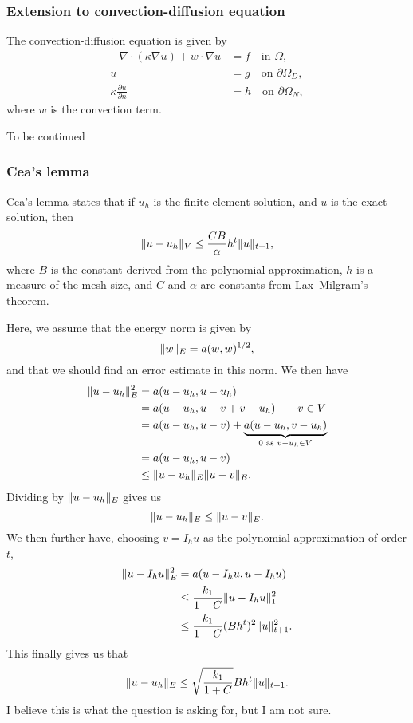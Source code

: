 \subsubsection{Extension to convection-diffusion equation}
The convection-diffusion equation is given by
\begin{equation}
    \begin{split}
        -\nabla \cdot (\kappa \nabla u) + w \cdot \nabla u &= f \quad \text{in } \Omega, \\
        u &= g \quad \text{on } \partial\Omega_D, \\
        \kappa \frac{\partial u}{\partial n} &= h \quad \text{on } \partial\Omega_N,
    \end{split}
\end{equation}
where $w$ is the convection term.

{\Large To be continued}

\subsubsection{Cea's lemma}
Cea's lemma states that if $u_h$ is the finite element solution, and $u$ is the exact solution, then
\begin{equation}
    \lVert u - u_h\rVert_V \leq \frac{C B}{\alpha} h^t \lVert u\rVert_{t + 1},
\end{equation}
where $B$ is the constant derived from the polynomial approximation, $h$ is a measure of the mesh size, and $C$ and $\alpha$ are constants from Lax--Milgram's theorem. %

Here, we assume that the energy norm is given by
\begin{equation}
    \lVert w\rVert_E = a(w, w)^{1/2},
\end{equation}
and that we should find an error estimate in this norm.
We then have
\begin{align*}
    \lVert u - u_h\rVert_E^2 &= a(u - u_h, u - u_h) \\
    &= a(u - u_h, u - v + v - u_h) \qquad v \in V \\
    &= a(u - u_h, u - v) + \underbrace{a(u - u_h, v - u_h)}_{0 \text{ as } v - u_h \in V} \\
    &= a(u - u_h, u - v) \\
    &\leq \lVert u - u_h\rVert_E \lVert u - v\rVert_E.
\end{align*}
Dividing by $\lVert u - u_h\rVert_E$ gives us
\begin{equation}
    \lVert u - u_h\rVert_E \leq \lVert u - v\rVert_E.
\end{equation}
We then further have, choosing $v = I_h u$ as the polynomial approximation of order $t$,
\begin{align*}
    \lVert u - I_h u\rVert_E^2 &= a(u - I_h u, u - I_h u) \\
    &\leq \frac{k_1}{1 + C} \lVert u - I_h u\rVert_1^2 \\
    &\leq \frac{k_1}{1 + C} (B h^t)^2 \lVert u\rVert_{t + 1}^2.
\end{align*}
This finally gives us that
\begin{equation}
    \lVert u - u_h\rVert_E \leq \sqrt{\frac{k_1}{1 + C}} B h^t \lVert u\rVert_{t + 1}.
\end{equation}
I believe this is what the question is asking for, but I am not sure.

